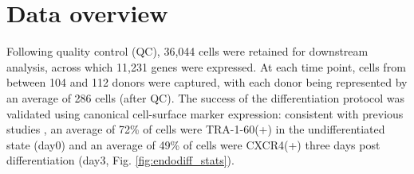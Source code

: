 \newpage

\section{Data overview}

Following quality control (QC), 36,044 cells were retained for downstream analysis, across which 11,231 genes were expressed.
At each time point, cells from between 104 and 112 donors were captured, with each donor being represented by an average of 286 cells (after QC). 
The success of the differentiation protocol was validated using canonical cell-surface marker expression: consistent with previous studies \cite{chu2016single}, an average of 72\% of cells were TRA-1-60(+) in the undifferentiated state (day0) and an average of 49\% of cells were CXCR4(+) three days post differentiation (day3, Fig. \ref{fig:endodiff_stats}).
 
